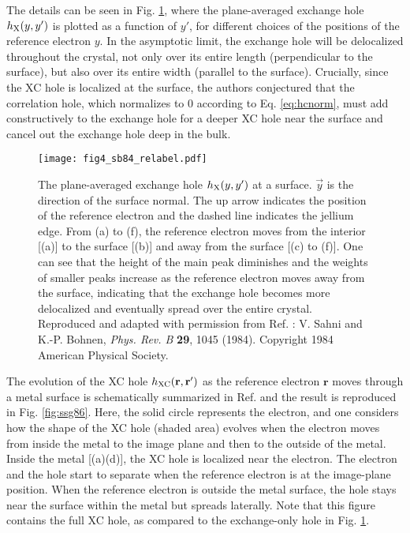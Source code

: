 \documentclass[aip, amsmath, amssymb, reprint, longbibliography]{revtex4-2}
\begin{document}
The details can be seen in Fig. \ref{fig:sb84}, where the plane-averaged exchange hole $h_{\rm X}(y,y')$ is plotted as a function of $y'$, for different choices of the positions of the reference electron $y$. In the asymptotic limit, the exchange hole will be delocalized throughout the crystal, not only over its entire length (perpendicular to the surface), but also over its entire width (parallel to the surface). Crucially, since the XC hole is localized at the surface, the authors conjectured that the correlation hole, which normalizes to 0 according to Eq. \eqref{eq:hcnorm}, must add constructively to the exchange hole for a deeper XC hole near the surface and cancel out the exchange hole deep in the bulk.

\begin{figure}[htp]
\centering
\texttt{[image: fig4\_sb84\_relabel.pdf]}
\caption{The plane-averaged exchange hole $h_{\rm X}(y,y')$ at a surface. $\vec{y}$ is the direction of the surface normal. The up arrow indicates the position of the reference electron and the dashed line indicates the jellium edge. From (a) to (f), the reference electron moves from the interior [(a)] to the surface [(b)] and away from the surface [(c) to (f)]. One can see that the height of the main peak diminishes and the weights of smaller peaks increase as the reference electron moves away from the surface, indicating that the exchange hole becomes more delocalized and eventually spread over the entire crystal. Reproduced and adapted with
permission from Ref. : V. Sahni and K.-P. Bohnen, \emph{Phys. Rev. B} \textbf{29}, 1045 (1984). Copyright 1984 American Physical Society.}
\label{fig:sb84}
\end{figure}

The evolution of the XC hole $h_{\rm XC}(\mathbf{r},\mathbf{r}')$ as the reference electron $\mathbf{r}$ moves through a metal surface is schematically summarized in Ref.  and the result is reproduced in Fig. \ref{fig:ssg86}. Here, the solid circle represents the electron, and one considers how the shape of the XC hole (shaded area) evolves when the electron moves from inside the metal to the image plane and then to the outside of the metal. Inside the metal [(a)(d)], the XC hole is localized near the electron. The electron and the hole start to separate when the reference electron is at the image-plane position. When the reference electron is outside the metal surface, the hole stays near the surface within the metal but spreads laterally. Note that this figure contains the full XC hole, as compared to the exchange-only hole in Fig. \ref{fig:sb84}.
\end{document}
